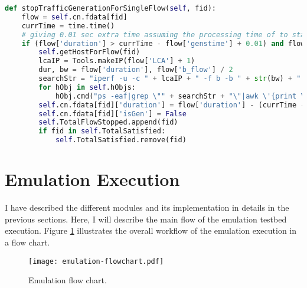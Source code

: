 \begin{lstlisting}[caption={Stop traffic generation implementation},label={lst:stgi},language=python,tabsize=2,basicstyle=\footnotesize,breaklines=true,showspaces=false,showstringspaces=false,showtabs=false,frame=single]
def stopTrafficGenerationForSingleFlow(self, fid):
	flow = self.cn.fdata[fid]
	currTime = time.time()
	# giving 0.01 sec extra time assuming the processing time of to start the ipref
	if (flow['duration'] > currTime - flow['genstime'] + 0.01) and flow['isSat'] == True and flow['isGen'] == True:
		self.getHostForFlow(fid)
		lcaIP = Tools.makeIP(flow['LCA'] + 1)
 		dur, bw = flow['duration'], flow['b_flow'] / 2
		searchStr = "iperf -u -c " + lcaIP + " -f b -b " + str(bw) + " -t " + str(dur)
		for hObj in self.hObjs:
			hObj.cmd("ps -eaf|grep \"" + searchStr + "\"|awk \'{print \"kill -9 \" $2}\'|sh")
		self.cn.fdata[fid]['duration'] = flow['duration'] - (currTime - flow['genstime'])
		self.cn.fdata[fid]['isGen'] = False
		self.TotalFlowStopped.append(fid)
		if fid in self.TotalSatisfied:
			self.TotalSatisfied.remove(fid)
\end{lstlisting}

\section{Emulation Execution} \label{sec:emuexec}
I have described the different modules and its implementation in details in the previous sections. Here, I will describe the main flow of the emulation testbed execution. Figure \ref{fig:emulationflow} illustrates the overall workflow of the emulation execution in a flow chart.
\begin{figure}[tb]
\begin{center}
	\resizebox{\textwidth}{!}
	{\texttt{[image: emulation-flowchart.pdf]}}
	\caption{Emulation flow chart.}
	\label{fig:emulationflow}
\end{center}
\end{figure}

